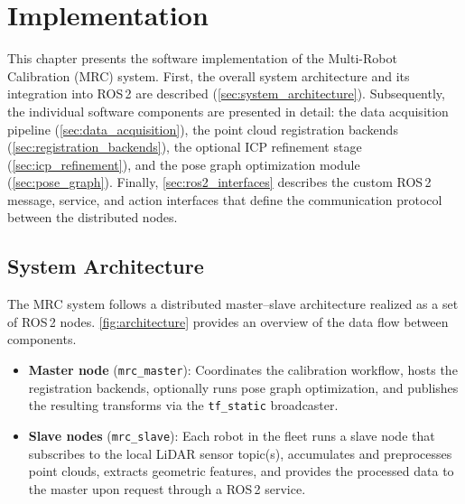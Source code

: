 \chapter{Implementation}
\label{ch:implementation}

This chapter presents the software implementation of the Multi-Robot Calibration (MRC) system.
First, the overall system architecture and its integration into ROS\,2 are described
(\autoref{sec:system_architecture}).
Subsequently, the individual software components are presented in detail:
the data acquisition pipeline (\autoref{sec:data_acquisition}),
the point cloud registration backends (\autoref{sec:registration_backends}),
the optional ICP refinement stage (\autoref{sec:icp_refinement}),
and the pose graph optimization module (\autoref{sec:pose_graph}).
Finally, \autoref{sec:ros2_interfaces} describes the custom ROS\,2 message, service, and action
interfaces that define the communication protocol between the distributed nodes.

\section{System Architecture}
\label{sec:system_architecture}

The MRC system follows a distributed master--slave architecture realized as a set of
ROS\,2 nodes.
\autoref{fig:architecture} provides an overview of the data flow between components.

\begin{itemize}
    \item \textbf{Master node} (\texttt{mrc\_master}):
          Coordinates the calibration workflow, hosts the registration backends,
          optionally runs pose graph optimization, and publishes the resulting
          transforms via the \texttt{tf\_static} broadcaster.
    \item \textbf{Slave nodes} (\texttt{mrc\_slave}):
          Each robot in the fleet runs a slave node that subscribes to the local
          LiDAR sensor topic(s), accumulates and preprocesses point clouds, extracts
          geometric features, and provides the processed data to the master upon
          request through a ROS\,2 service.
\end{itemize}


